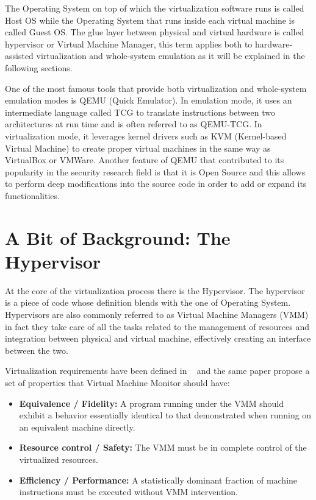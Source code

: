 The Operating System on top of which the virtualization software runs is called Host OS while the Operating System that runs inside each virtual machine is called Guest OS. The glue layer between physical and virtual hardware is called hypervisor or Virtual Machine Manager, this term applies both to hardware-assisted virtualization and whole-system emulation as it will be explained in the following sections.

One of the most famous tools that provide both virtualization and whole-system emulation modes is QEMU (Quick Emulator). In emulation mode, it uses an intermediate language called TCG to translate instructions between two architectures at run time and is often referred to as QEMU-TCG. In virtualization mode, it leverages kernel drivers such as KVM (Kernel-based Virtual Machine) to create proper virtual machines in the same way as VirtualBox or VMWare. Another feature of QEMU that contributed to its popularity in the security research field is that it is Open Source and this allows to perform deep modifications into the source code in order to add or expand its functionalities.

\section{A Bit of Background: The Hypervisor}

At the core of the virtualization process there is the Hypervisor. The hypervisor is a piece of code whose definition blends with the one of Operating System. Hypervisors are also commonly referred to as Virtual Machine Managers (VMM) in fact they take care of all the tasks related to the management of resources and integration between physical and virtual machine, effectively creating an interface between the two.

Virtualization requirements have been defined in ~\cite{virtreq} and the same paper propose a set of properties that Virtual Machine Monitor should have:

\begin{itemize}
    \item \textbf{Equivalence / Fidelity:} A program running under the VMM should exhibit a behavior essentially identical to that demonstrated when running on an equivalent machine directly.
    \item \textbf{Resource control / Safety:} The VMM must be in complete control of the virtualized resources.
    \item \textbf{Efficiency / Performance:} A statistically dominant fraction of machine instructions must be executed without VMM intervention.
\end{itemize}

